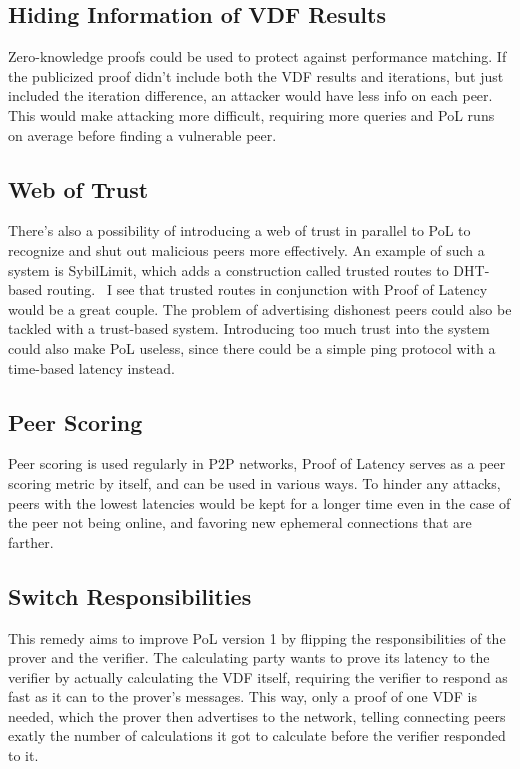 \subsection{Hiding Information of VDF Results}
Zero-knowledge proofs could be used to protect against performance matching. If the publicized proof didn't include both the VDF results and iterations, but just included the iteration difference, an attacker would have less info on each peer. This would make attacking more difficult, requiring more queries and PoL runs on average before finding a vulnerable peer.

\subsection{Web of Trust}
There's also a possibility of introducing a web of trust in parallel to PoL to recognize and shut out malicious peers more effectively. An example of such a system is SybilLimit, which adds a construction called trusted routes to DHT-based routing.~\cite{Yu2008-xl} I see that trusted routes in conjunction with Proof of Latency would be a great couple. The problem of advertising dishonest peers could also be tackled with a trust-based system. Introducing too much trust into the system could also make PoL useless, since there could be a simple ping protocol with a time-based latency instead.
~
\subsection{Peer Scoring}
Peer scoring is used regularly in P2P networks, 
Proof of Latency serves as a peer scoring metric by itself, and can be used in various ways. To hinder any attacks, peers with the lowest latencies would be kept for a longer time even in the case of the peer not being online, and favoring new ephemeral connections that are farther. 

\subsection{Switch Responsibilities}
This remedy aims to improve PoL version 1 by flipping the responsibilities of the prover and the verifier. The calculating party wants to prove its latency to the verifier by actually calculating the VDF itself, requiring the verifier to respond as fast as it can to the prover's messages. This way, only a proof of one VDF is needed, which the prover then advertises to the network, telling connecting peers exatly the number of calculations it got to calculate before the verifier responded to it. 

